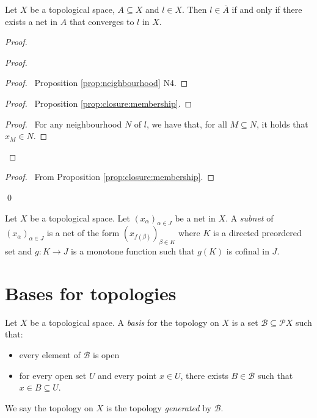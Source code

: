 \begin{prop}[AC]
Let $X$ be a topological space, $A \subseteq X$ and $l \in X$. Then $l \in 
\overline{A}$ if and only if there exists a net in $A$ that converges to $l$ in 
$X$.
\end{prop}

\begin{proof}
  \pf
  \begin{proof}
    \begin{proof}
      \pf\ Proposition \ref{prop:neighbourhood} N4.
    \end{proof}
    \begin{proof}
      \pf\ Proposition \ref{prop:closure:membership}.
    \end{proof}
    \begin{proof}
      \pf\ For any neighbourhood $N$ of $l$, we have that, for all $M \subseteq 
      N$, it holds that $x_M \in N$.
    \end{proof}
  \end{proof}
  \begin{proof}
    \pf\ From Proposition \ref{prop:closure:membership}.
  \end{proof}
  \qed
\end{proof}

\begin{df}[Subnet]
  Let $X$ be a topological space. Let $(x_\alpha)_{\alpha \in J}$ be a net in 
  $X$. A \emph{subnet} of $(x_\alpha)_{\alpha \in J}$ is a net of the form 
  $(x_{f(\beta)})_{\beta \in K}$ where $K$ is a directed preordered set and $g 
  : K \rightarrow J$ is a monotone function such that $g(K)$ is cofinal in $J$.
\end{df}

\section{Bases for topologies}

\begin{df}[Basis]
Let $X$ be a topological space. A \emph{basis} for the topology on $X$ is a set $\mathcal{B} \subseteq \mathcal{P} X$ such that:
\begin{itemize}
\item every element of $\mathcal{B}$ is open
\item for every open set $U$ and every point $x \in U$, there exists $B \in \mathcal{B}$ such that $x \in B \subseteq U$.
\end{itemize}
We say the topology on $X$ is the topology \emph{generated} by $\mathcal{B}$.
\end{df}

